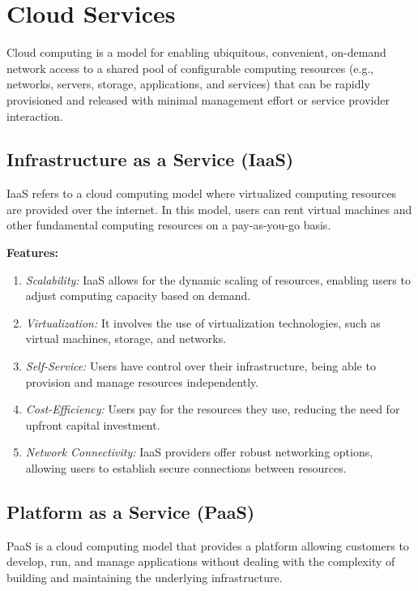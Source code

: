 \documentclass[11pt]{article}
\begin{document}
\section{Cloud Services}

Cloud computing is a model for enabling ubiquitous, convenient, on-demand network access to a shared pool of configurable computing resources (e.g., networks, servers, storage, applications, and services) that can be rapidly provisioned and released with minimal management effort or service provider interaction.

\subsection{Infrastructure as a Service (IaaS)}
IaaS refers to a cloud computing model where virtualized computing resources are provided over the internet. In this model, users can rent virtual machines and other fundamental computing resources on a pay-as-you-go basis.

\textbf{Features:}
\begin{enumerate}
    \item \textit{Scalability:} IaaS allows for the dynamic scaling of resources, enabling users to adjust computing capacity based on demand.
    \item \textit{Virtualization:} It involves the use of virtualization technologies, such as virtual machines, storage, and networks.
    \item \textit{Self-Service:} Users have control over their infrastructure, being able to provision and manage resources independently.
    \item \textit{Cost-Efficiency:} Users pay for the resources they use, reducing the need for upfront capital investment.
    \item \textit{Network Connectivity:} IaaS providers offer robust networking options, allowing users to establish secure connections between resources.
\end{enumerate}

\subsection{Platform as a Service (PaaS)}
PaaS is a cloud computing model that provides a platform allowing customers to develop, run, and manage applications without dealing with the complexity of building and maintaining the underlying infrastructure.
\end{document}
